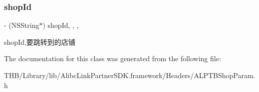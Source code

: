 \subsubsection{\texorpdfstring{shop\+Id}{shopId}}
{\footnotesize\ttfamily -\/ (N\+S\+String$\ast$) shop\+Id\hspace{0.3cm}{\ttfamily [read]}, {\ttfamily [write]}, {\ttfamily [nonatomic]}, {\ttfamily [strong]}}

shop\+Id,要跳转到的店铺 

The documentation for this class was generated from the following file\+:\begin{DoxyCompactItemize}
\item 
T\+H\+B/\+Library/lib/\+Alibc\+Link\+Partner\+S\+D\+K.\+framework/\+Headers/A\+L\+P\+T\+B\+Shop\+Param.\+h\end{DoxyCompactItemize}
